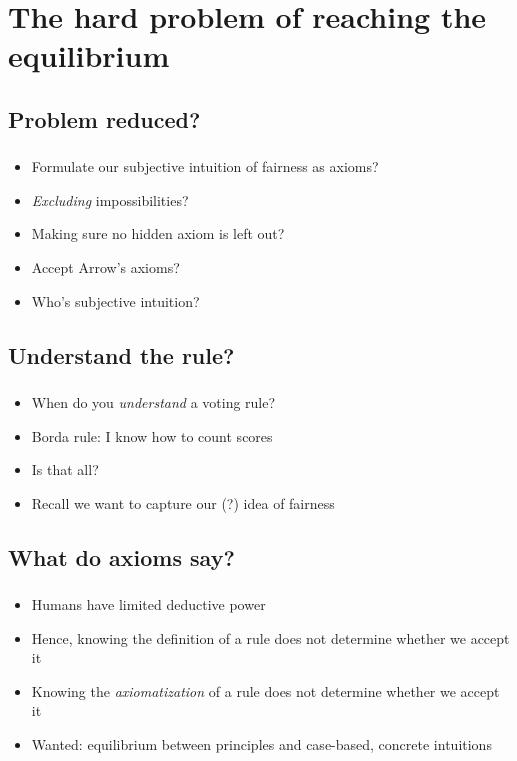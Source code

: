 \documentclass[french,english]{beamer}
\begin{document}
\section{The hard problem of reaching the equilibrium}
\subsection{Problem reduced?}
\begin{frame}
	\frametitle{\subsecname}
	\begin{itemize}
		\item Formulate our subjective intuition of fairness as axioms?
		\item \emph{Excluding} impossibilities?
		\item Making sure no hidden axiom is left out?
		\item Accept Arrow’s axioms?
		\item Who’s subjective intuition?
	\end{itemize}
\end{frame}

\subsection{Understand the rule?}
\begin{frame}
	\frametitle{\subsecname}
	\begin{itemize}
		\item When do you \emph{understand} a voting rule?
		\item Borda rule: I know how to count scores
		\item Is that all?
		\item Recall we want to capture our (?) idea of fairness
	\end{itemize}
\end{frame}

\subsection{What do axioms say?}
\begin{frame}
	\frametitle{\subsecname}
	\begin{itemize}
		\item Humans have limited deductive power
		\item Hence, knowing the definition of a rule does not determine whether we accept it
		\item Knowing the \emph{axiomatization} of a rule does not determine whether we accept it
		\item Wanted: equilibrium between principles and case-based, concrete intuitions \citep{goodman_fact_1983, rawls_theory_1999}
	\end{itemize}
\end{frame}
\end{document}
